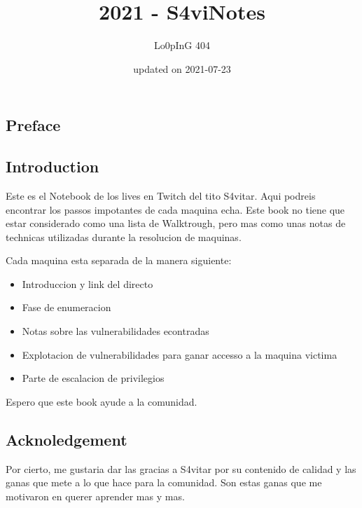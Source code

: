 \documentclass{assets/ipesethesis}
\title{2021 - S4viNotes}
\author{Lo0pInG 404}
\date{updated on 2021-07-23}
\providecommand{\tightlist}{%
  \setlength{\itemsep}{0pt}\setlength{\parskip}{0pt}}
\begin{document}
  \maketitle

\frontmatter %


  \begin{resume}
    \hypertarget{preface}{%
    \section*{Preface}\label{preface}}
    
    \hypertarget{introduction}{%
    \subsection*{Introduction}\label{introduction}}
    
    Este es el Notebook de los lives en Twitch del tito S4vitar. Aqui podreis encontrar los passos impotantes de cada maquina
    echa. Este book no tiene que estar considerado como una lista de Walktrough, pero mas como unas notas de technicas utilizadas
    durante la resolucion de maquinas.
    
    Cada maquina esta separada de la manera siguiente:
    
    \begin{itemize}
    \tightlist
    \item
      Introduccion y link del directo
    \item
      Fase de enumeracion
    \item
      Notas sobre las vulnerabilidades econtradas
    \item
      Explotacion de vulnerabilidades para ganar accesso a la maquina victima
    \item
      Parte de escalacion de privilegios
    \end{itemize}
    
    Espero que este book ayude a la comunidad.
    
    \hypertarget{acknoledgement}{%
    \subsection*{Acknoledgement}\label{acknoledgement}}
    
    Por cierto, me gustaria dar las gracias a S4vitar por su contenido de calidad y las ganas que mete a lo que hace para la comunidad.
    Son estas ganas que me motivaron en querer aprender mas y mas.
  \end{resume}
\end{document}
